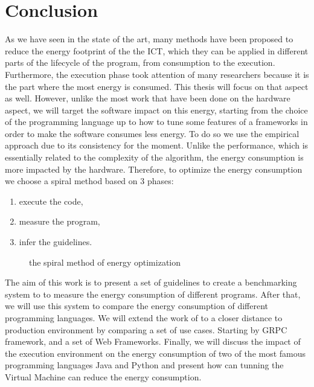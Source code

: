 \section{Conclusion}
As we have seen in the state of the art, many methods have been proposed to reduce the energy footprint of the the ICT, which they can be applied in different parts of the lifecycle of the program, from consumption to the execution.
Furthermore, the execution phase took attention of many researchers because it is the part where the most energy is consumed.
This thesis will focus on that aspect as well.
However, unlike the most work that have been done on the hardware aspect, we will target the software impact on this energy, starting from the choice of the programming language up to how to tune some features of a frameworks in order to make the software consumes less energy.
To do so we use the empirical approach due to its consistency for the moment.
Unlike the performance, which is essentially related to the complexity of the algorithm, the energy consumption is more impacted by the hardware.
Therefore, to optimize the energy consumption we choose a spiral method based on 3 phases:
\begin{enumerate}
    \item execute the code,
    \item measure the program,
    \item infer the guidelines.
\end{enumerate}


\begin{figure}[!hbt]
    \caption{the spiral method of energy optimization }\label{fig:spirals}
\end{figure}

The aim of this work is to present a set of guidelines to create a benchmarking system to to measure the energy consumption of different programs.
After that, we will use this system to compare the energy consumption of different programming languages. We will extend the work of \citeauthor{pereira2017energy} to a closer distance to production environment by comparing a set of use cases.
Starting by GRPC framework, and a set of Web Frameworks.
Finally, we will discuss the impact of the execution environment on the energy consumption of two of the most famous programming languages Java and Python and present how can tunning the Virtual Machine can reduce the energy consumption.
